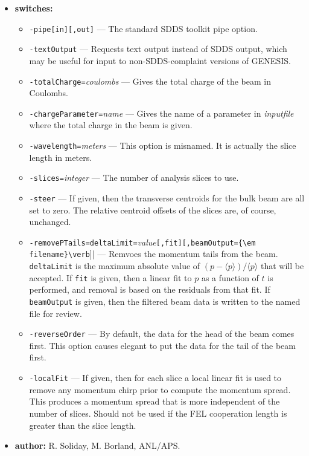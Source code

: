 \begin{itemize}
\item {\bf switches:}
\begin{itemize}
\item \verb|-pipe[in][,out]| --- The standard SDDS toolkit pipe option.
\item \verb|-textOutput| --- Requests text output instead of SDDS output, which may be
        useful for input to non-SDDS-complaint versions of GENESIS.
\item \verb|-totalCharge=|{\em coulombs} --- Gives the total charge of the beam in Coulombs.
\item \verb|-chargeParameter=|{\em name} --- Gives the name of a parameter in {\em inputfile} where
        the total charge in the beam is given.
\item \verb|-wavelength=|{\em meters} --- This option is misnamed.  It is actually the slice length
        in meters.
\item \verb|-slices=|{\em integer} --- The number of analysis slices to use.
\item \verb|-steer| --- If given, then the transverse centroids for the bulk beam are all set to
        zero.  The relative centroid offsets of the slices are, of course, unchanged.
\item \verb|-removePTails=deltaLimit=|{\em value}\verb|[,fit][,beamOutput={\em filename}\verb|]| ---
        Remvoes the momentum tails from the beam.  \verb|deltaLimit| is the maximum absolute value
        of $(p-\langle p \rangle)/\langle p \rangle$ that will be accepted.  If \verb|fit| is given,
        then a linear fit to $p$ as a function of $t$ is performed, and removal is based on the
        residuals from that fit.  If \verb|beamOutput| is given, then the filtered beam data is
        written to the named file for review.
\item \verb|-reverseOrder| --- By default, the data for the head of the beam comes first.  This
        option causes elegant to put the data for the tail of the beam first.
\item \verb|-localFit| --- If given, then for each slice a local
 linear fit is used to remove any momentum chirp prior to compute the
 momentum spread.  This produces a momentum spread that is more
 independent of the number of slices.  Should not be used if the FEL
 cooperation length is greater than the slice length.
\end{itemize}

\item {\bf author:} R. Soliday, M. Borland, ANL/APS.
\end{itemize}

